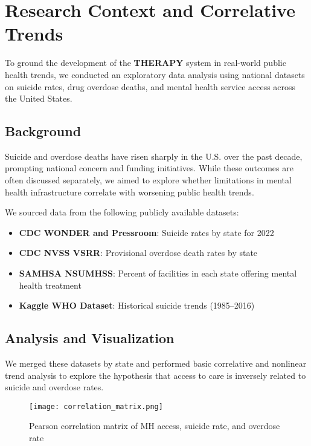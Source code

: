 \section*{Research Context and Correlative Trends}

To ground the development of the \textbf{THERAPY} system in real-world public health trends, we conducted an exploratory data analysis using national datasets on suicide rates, drug overdose deaths, and mental health service access across the United States.

\subsection*{Background}

Suicide and overdose deaths have risen sharply in the U.S. over the past decade, prompting national concern and funding initiatives. While these outcomes are often discussed separately, we aimed to explore whether limitations in mental health infrastructure correlate with worsening public health trends.

We sourced data from the following publicly available datasets:

\begin{itemize}
  \item \textbf{CDC WONDER and Pressroom}: Suicide rates by state for 2022\autocite{cdc_suicide_2022}
  \item \textbf{CDC NVSS VSRR}: Provisional overdose death rates by state\autocite{cdc_overdose_2022}
  \item \textbf{SAMHSA NSUMHSS}: Percent of facilities in each state offering mental health treatment\autocite{samhsa_nsumhss_2023}
  \item \textbf{Kaggle WHO Dataset}: Historical suicide trends (1985–2016)\autocite{kaggle_suicide_1985_2016}
\end{itemize}

\subsection*{Analysis and Visualization}

We merged these datasets by state and performed basic correlative and nonlinear trend analysis to explore the hypothesis that access to care is inversely related to suicide and overdose rates.

\begin{figure}[H]
  \centering
  \texttt{[image: correlation\_matrix.png]}
  \caption{Pearson correlation matrix of MH access, suicide rate, and overdose rate}
\end{figure}


